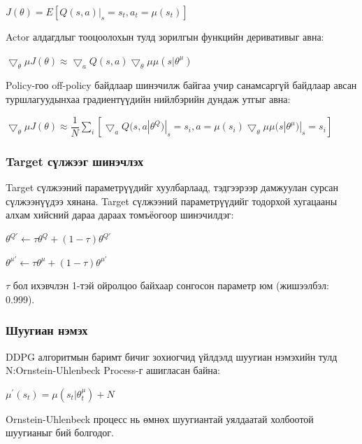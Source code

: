 \documentclass[12pt,A4]{report}
\begin{document}
\begin{center}
$J(\theta) = E[Q(s, a)|_s=s_t,a_t=\mu(s_t)]$
\end{center}

Actor алдагдлыг тооцоолохын тулд зорилгын функцийн деривативыг авна:

\begin{center}
$\bigtriangledown_\theta\mu J(\theta) \approx \bigtriangledown_a Q(s, a)\bigtriangledown_\theta\mu \mu(s|\theta^\mu)$
\end{center}

Policy-гоо off-policy байдлаар шинэчилж байгаа учир санамсаргүй байдлаар авсан туршлагуудынхаа градиентүүдийн нийлбэрийн дундаж утгыг авна:

\begin{center}
$\bigtriangledown_\theta\mu J(\theta) \approx \dfrac{1}{N}\sum_{i}[\bigtriangledown_a Q(s, a|\theta^Q)|_s=s_i,a=\mu(s_i)\bigtriangledown_\theta\mu \mu(s|\theta^\mu)|_s=s_i]$
\end{center}

\subsubsection{Target сүлжээг шинэчлэх}
 
Target сүлжээний параметрүүдийг хуулбарлаад, тэдгээрээр дамжуулан сурсан сүлжээнүүдээ хянана. Target сүлжээний параметрүүдийг тодорхой хугацааны алхам хийсний дараа дараах томъёогоор шинэчилдэг:

\begin{center}
$\theta^{Q{'}} \longleftarrow \tau\theta^Q + (1-\tau)\theta^{Q{'}}$ 

$\theta^{\mu{'}} \longleftarrow \tau\theta^\mu + (1-\tau)\theta^{\mu{'}}$ 

$\tau $ бол ихэвчлэн 1-тэй ойролцоо байхаар сонгосон параметр юм (жишээлбэл: 0.999).
\end{center}

\subsubsection{Шуугиан нэмэх}

DDPG алгоритмын баримт бичиг зохиогчид үйлдэлд шуугиан нэмэхийн тулд N:Ornstein-Uhlenbeck Process-г ашигласан байна:

\begin{center}
$\mu^{'}(s_t) = \mu(s_t|\theta_t^\mu) + N$
\end{center}

Ornstein-Uhlenbeck процесс нь өмнөх шуугиантай уялдаатай холбоотой шуугианыг бий болгодог.
\end{document}
